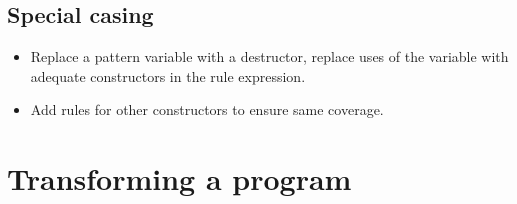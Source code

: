 \subsection{Special casing}

\begin{itemize}

\item Replace a pattern variable with a destructor, replace uses of the
variable with adequate constructors in the rule expression.

\item Add rules for other constructors to ensure same coverage.

\end{itemize}

\section{Transforming a program}

